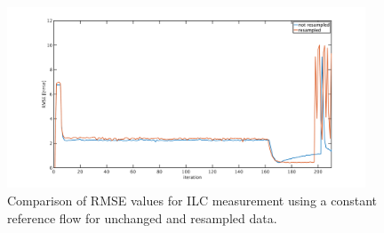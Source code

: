 \begin{figure}[ht!]
  \centering
  \includegraphics[width=0.95\textwidth]{images/chapt_5/ILC/RMSE_ilc_var_dist_comp_const.pdf}
  \caption[Comparison of RMSE values for ILC measurement using a constant reference flow for unchanged and resampled data]{Comparison of RMSE values for ILC measurement using a constant reference flow for unchanged and resampled data.}
  \label{fig:RMSE_ilc_var_dist_comp_const}
\end{figure}


